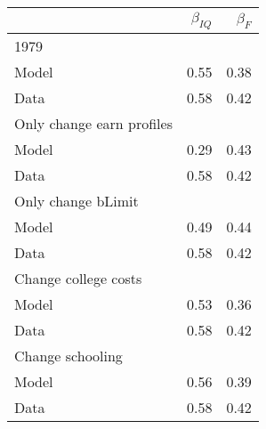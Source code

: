 \begin{tabular}{lrr}
\hline
  & $\beta_{IQ}$  & $\beta_{F}$  \\ 
\hline
1979 &   &   \\ 
Model & 0.55  & 0.38  \\ 
Data & 0.58  & 0.42  \\ 
Only change earn profiles &   &   \\ 
Model & 0.29  & 0.43  \\ 
Data & 0.58  & 0.42  \\ 
Only change bLimit &   &   \\ 
Model & 0.49  & 0.44  \\ 
Data & 0.58  & 0.42  \\ 
Change college costs &   &   \\ 
Model & 0.53  & 0.36  \\ 
Data & 0.58  & 0.42  \\ 
Change schooling &   &   \\ 
Model & 0.56  & 0.39  \\ 
Data & 0.58  & 0.42  \\ 
\hline
\end{tabular}%
